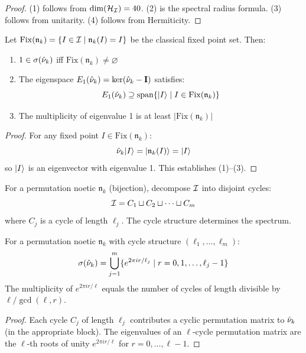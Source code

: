 \begin{proof}
(1) follows from $\dim(\mathcal{H}_{\mathcal{I}}) = 40$. (2) is the spectral radius formula. (3) follows from unitarity. (4) follows from Hermiticity.
\end{proof}

\begin{theorem}
\label{thm:fixed-point-eigenvalue}
Let $\mathrm{Fix}(\mathfrak{n}_k) = \{I \in \mathcal{I} \mid \mathfrak{n}_k(I) = I\}$ be the classical fixed point set. Then:
\begin{enumerate}
  \item $1 \in \sigma(\hat{\nu}_k)$ iff $\mathrm{Fix}(\mathfrak{n}_k) \neq \varnothing$
  \item The eigenspace $E_1(\hat{\nu}_k) = \ker(\hat{\nu}_k - \mathbf{I})$ satisfies:
  \[
  E_1(\hat{\nu}_k) \supseteq \mathrm{span}\{|I\rangle \mid I \in \mathrm{Fix}(\mathfrak{n}_k)\}
  \]
  \item The multiplicity of eigenvalue 1 is at least $|\mathrm{Fix}(\mathfrak{n}_k)|$
\end{enumerate}
\end{theorem}

\begin{proof}
For any fixed point $I \in \mathrm{Fix}(\mathfrak{n}_k)$:
\[
\hat{\nu}_k |I\rangle = |\mathfrak{n}_k(I)\rangle = |I\rangle
\]
so $|I\rangle$ is an eigenvector with eigenvalue 1. This establishes (1)--(3).
\end{proof}

\begin{definition}
\label{def:cycle-spectrum}
For a permutation noetic $\mathfrak{n}_k$ (bijection), decompose $\mathcal{I}$ into disjoint cycles:
\[
\mathcal{I} = C_1 \sqcup C_2 \sqcup \cdots \sqcup C_m
\]
where $C_j$ is a cycle of length $\ell_j$. The cycle structure determines the spectrum.
\end{definition}

\begin{theorem}
\label{thm:spectrum-permutation}
For a permutation noetic $\mathfrak{n}_k$ with cycle structure $(\ell_1, \ldots, \ell_m)$:
\[
\sigma(\hat{\nu}_k) = \bigcup_{j=1}^{m} \{e^{2\pi i r / \ell_j} \mid r = 0, 1, \ldots, \ell_j - 1\}
\]
The multiplicity of $e^{2\pi i r / \ell}$ equals the number of cycles of length divisible by $\ell / \gcd(\ell, r)$.
\end{theorem}

\begin{proof}
Each cycle $C_j$ of length $\ell_j$ contributes a cyclic permutation matrix to $\hat{\nu}_k$ (in the appropriate block). The eigenvalues of an $\ell$-cycle permutation matrix are the $\ell$-th roots of unity $e^{2\pi i r / \ell}$ for $r = 0, \ldots, \ell-1$.
\end{proof}

